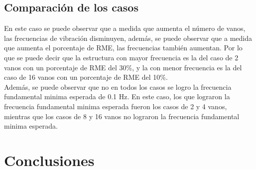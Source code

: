 \subsection{Comparación de los casos}

En este caso se puede observar que a medida que aumenta el número de vanos, las frecuencias de vibración disminuyen, además, se puede observar que a medida que aumenta el porcentaje de RME, las frecuencias también aumentan. Por lo que se puede decir que la estructura con mayor frecuencia es la del caso de 2 vanos con un porcentaje de RME del 30\%, y la con menor frecuencia es la del caso de 16 vanos con un porcentaje de RME del 10\%.\\
Además, se puede observar que no en todos los casos se logro la frecuencia fundamental minima esperada de 0.1 Hz. En este caso, los que lograron la frecuencia fundamental minima esperada fueron los casos de 2 y 4 vanos, mientras que los casos de 8 y 16 vanos no lograron la frecuencia fundamental minima esperada.


\section{Conclusiones}